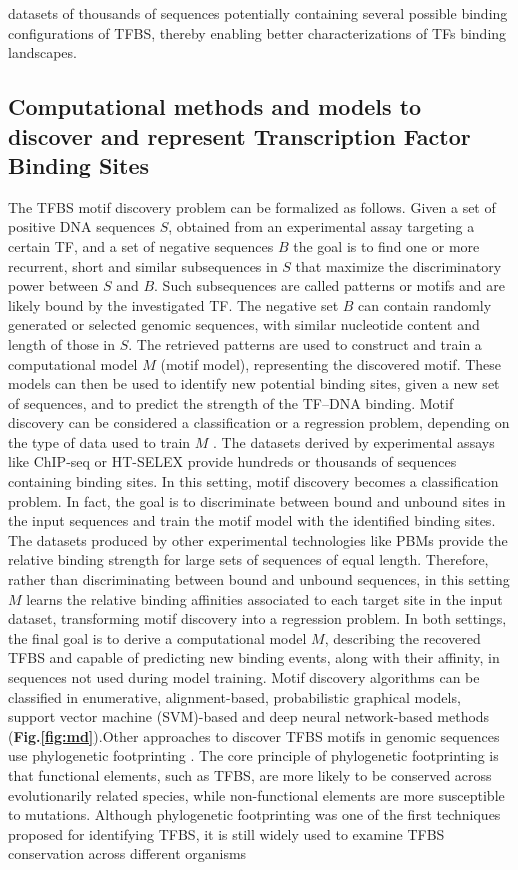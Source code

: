 \documentclass[a4paper, titlepage, openright]{book}
\begin{document}
datasets of thousands of sequences potentially containing several possible binding configurations of TFBS, thereby enabling better characterizations of TFs binding landscapes.
\subsection{Computational methods and models to discover and represent Transcription Factor Binding Sites}
The TFBS motif discovery problem can be formalized as follows. Given a set of positive DNA sequences $S$, obtained from an experimental assay targeting a certain TF, and a set of negative sequences $B$ the goal is to find one or more recurrent, short and similar subsequences in $S$ that maximize the discriminatory power between $S$ and $B$. Such subsequences are called patterns or motifs and are likely bound by the investigated TF.  The negative set $B$ can contain randomly generated or selected genomic sequences, with similar nucleotide content and length of those in $S$. The retrieved patterns are used to construct and train a computational model $M$ (motif model), representing the discovered motif. These models can then be used to identify new potential binding sites, given a new set of sequences, and to predict the strength of the TF–DNA binding. Motif discovery can be considered a classification or a regression problem, depending on the type of data used to train $M$ \citep{tognon2023survey}.  The datasets derived by experimental assays like ChIP-seq or HT-SELEX provide hundreds or thousands of sequences containing binding sites. In this setting, motif discovery becomes a classification problem. In fact, the goal is to discriminate between bound and unbound sites in the input sequences and train the motif model with the identified binding sites. The datasets produced by other experimental technologies like PBMs provide the relative binding strength for large sets of sequences of equal length. Therefore, rather than discriminating between bound and unbound sequences, in this setting $M$ learns the relative binding affinities associated to each target site in the input dataset, transforming motif discovery into a regression problem. In both settings, the final goal is to derive a computational model $M$, describing the recovered TFBS and capable of predicting new binding events, along with their affinity, in sequences not used during model training. Motif discovery algorithms can be classified in enumerative, alignment-based, probabilistic graphical models, support vector machine (SVM)-based and deep neural network-based methods (\textbf{Fig.\ref{fig:md}}).Other approaches to discover TFBS motifs in genomic sequences use phylogenetic footprinting \citep{mccue2001phylogenetic,blanchette2002discovery}. The core principle of phylogenetic footprinting is that functional elements, such as TFBS, are more likely to be conserved across evolutionarily related species, while non-functional elements are more susceptible to mutations. Although phylogenetic footprinting was one of the first techniques proposed for identifying TFBS, it is still widely used to examine TFBS conservation across different organisms 
\end{document}
